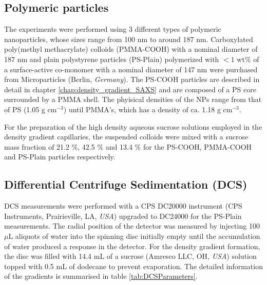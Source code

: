 \subsection{Polymeric particles}

The experiments were performed using 3 different types of polymeric nanoparticles, whose sizes range from 100 nm to around 187 nm. Carboxylated poly(methyl methacrylate) colloids (PMMA-COOH) with a nominal diameter of 187 nm and plain polystyrene particles (PS-Plain) polymerized with $<1$ wt$\%$ of a surface-active co-monomer with a nominal diameter of 147 nm were purchased from Microparticles (Berlin, \emph{Germany}). The PS-COOH particles are described in detail in chapter \ref{chap:density_gradient_SAXS} and are composed of a PS core surrounded by a PMMA shell. The phyisical densities of the NPs range from that of PS (1.05 g cm$^{-3}$) until PMMA's, which has a density of ca. 1.18 g cm$^{-3}$.

For the preparation of the high density aqueous sucrose solutions employed in the density gradient capillaries, the suspended colloids were mixed with a sucrose mass fraction of 21.2 $\%$, 42.5 $\%$ and 13.4 $\%$ for the PS-COOH, PMMA-COOH and PS-Plain particles respectively.


\subsection{Differential Centrifuge Sedimentation (DCS)}
DCS measurements were performed with a CPS DC20000 instrument (CPS Instruments, Prairieville, LA, \emph{USA}) upgraded to DC24000 for the PS-Plain measurements. The radial position of the detector was measured by injecting 100 $\mu$L aliquots of water into the spinning disc initially empty until the accumulation of water produced a response in the detector. For the density gradient formation, the disc was filled with 14.4 mL of a sucrose (Amresco LLC, OH, \emph{USA}) solution topped with 0.5 mL of dodecane to prevent evaporation. The detailed information of the gradients is summarised in table \ref{tab:DCSParameters}.

